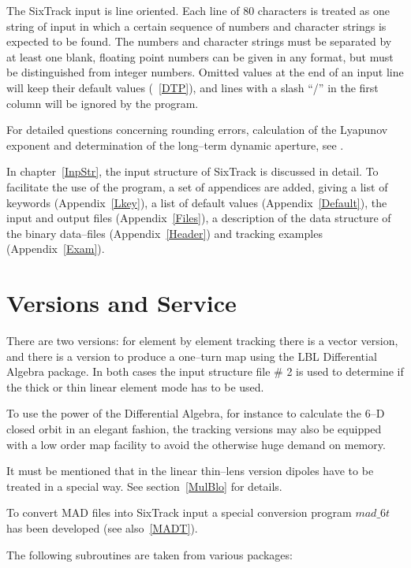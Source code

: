 \documentclass[a4paper,11pt]{report}
\begin{document}
The SixTrack input is line oriented. Each line of 80 characters is
treated as one string of input in which a certain sequence of numbers
and character strings is expected to be found.  The numbers and
character strings must be separated by at least one blank, floating
point numbers can be given in any format, but must be distinguished
from integer numbers. Omitted values at the end of an input line will
keep their default values (~\ref{DTP}), and lines with a slash ``/'' in
the first column will be ignored by the program.

For detailed questions concerning rounding errors, calculation of the
Lyapunov exponent and determination of the long--term dynamic
aperture, see \cite{thesis}.

In chapter~\ref{InpStr}, the input structure of SixTrack is discussed
in detail.  To facilitate the use of the program, a set of appendices
are added, giving a list of keywords \mbox{(Appendix~\ref{Lkey}),} a
list of default values \mbox{(Appendix~\ref{Default}),} the input and
output files \mbox{(Appendix~\ref{Files}),} a description of the data
structure of the binary data--files \mbox{(Appendix~\ref{Header})} and
tracking examples \mbox{(Appendix~\ref{Exam}).}

\chapter{Versions and Service}

There are two versions: for element by element tracking there
is a vector version, and there is a version to produce a
one--turn map using the LBL Differential Algebra package. In both
cases the input structure file \# 2 is used to determine if the thick
or thin linear element mode has to be used.

To use the power of the Differential Algebra, for instance to
calculate the 6--D closed orbit in an elegant fashion, the tracking
versions may also be equipped with a low order map facility to avoid
the otherwise huge demand on memory. 

It must be mentioned that in the linear thin--lens version dipoles
have to be treated in a special way. See section~\ref{MulBlo} for
details.

To convert MAD files into SixTrack input a special conversion program
$mad\_6t$~\cite{CONVERTOR} has been developed (see also~\ref{MADT}).

The following subroutines are taken from various packages:
\end{document}
